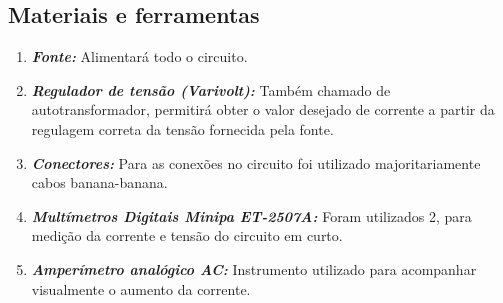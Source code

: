 \documentclass[a4paper,12pt,oneside,openany,table,xcdraw]{article}
\begin{document}
\subsection{Materiais e ferramentas} %
\begin{enumerate}[1 - ]
\item \emph{\textbf{Fonte:}}
Alimentará todo o circuito.

\item \emph{\textbf{Regulador de tensão (Varivolt):}}
Também chamado de autotransformador, permitirá obter o valor desejado de corrente a partir da regulagem correta da tensão fornecida pela fonte.

\item \emph{\textbf{Conectores:}}
Para as conexões no circuito foi utilizado majoritariamente cabos banana-banana.

\item \emph{\textbf{Multímetros Digitais Minipa ET-2507A:}}
Foram utilizados 2, para medição da corrente e tensão do circuito em curto.

\item \emph{\textbf{Amperímetro analógico AC:}}
Instrumento utilizado para acompanhar visualmente o aumento da corrente.
\end{enumerate}
\end{document}
